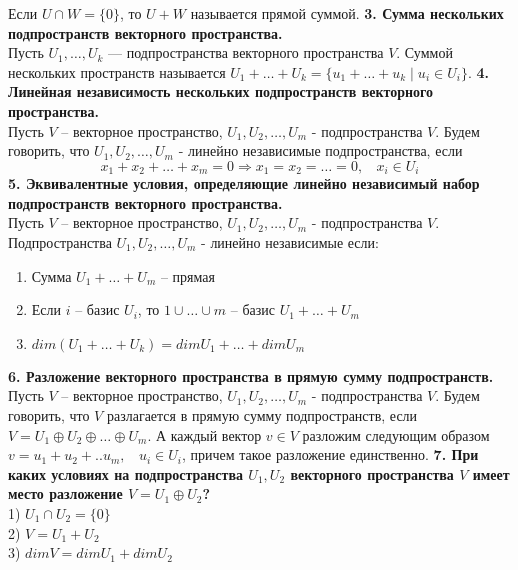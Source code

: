 \documentclass{article}
\begin{document}
Если $U \cap W = \{0\}$, то $U + W$ называется прямой суммой.
\newline
\newline
\textbf{3. Сумма нескольких подпространств векторного пространства.}\\
Пусть $U_1, \ldots, U_k$ --- подпространства векторного пространства $V$. Суммой нескольких пространств называется $U_1 + \ldots + U_k = \{u_1 + \ldots + u_k \; | \; u_i \in U_i \}$.
\newline
\newline
\textbf{4. Линейная независимость нескольких подпространств векторного пространства.}\\
   Пусть $V$ -- векторное пространство, $U_1, U_2, \dotso, U_m$ - подпространства $V$. Будем говорить, что $U_1, U_2, \dotso, U_m$ - линейно независимые подпространства, если
   $$
       x_1 + x_2 + \dotso + x_m = 0 \Rightarrow x_1 = x_2 = \dotso = 0, ~~~~ x_i \in U_i
   $$
\noindent
\textbf{5. Эквивалентные условия, определяющие линейно независимый набор подпространств векторного пространства.}\\
   Пусть $V$ -- векторное пространство, $U_1, U_2, \dotso, U_m$ - подпространства $V$. Подпространства $U_1, U_2, \dotso, U_m$ - линейно независимые если:
   \begin{enumerate}
       \item Сумма $U_1 + \dotso + U_m$ -- прямая
       \item Если $i$ -- базис $U_i$, то $1 \cup \dotso \cup m$ -- базис $U_1 + \dotso + U_m$
       \item $dim(U_1 + \dotso + U_k) = dim U_1 + \dotso + dim U_m$
   \end{enumerate}
\noindent
\textbf{6. Разложение векторного пространства в прямую сумму подпространств.}\\
   Пусть $V$ -- векторное пространство, $U_1, U_2, \dotso, U_m$ - подпространства $V$. Будем говорить, что $V$ разлагается в прямую сумму подпространств, если $V = U_1 \oplus U_2 \oplus \dotso \oplus U_m$. А каждый вектор $v\in V$ разложим следующим образом $v=u_1+u_2+..u_m,  ~~~~u_i\in U_i$, причем такое разложение единственно.
\newline
\newline
\textbf{7. При каких условиях на подпространства $U_1,U_2$ векторного пространства $V$ имеет место разложение $V = U_1 \oplus U_2$?}\\
1) $U_1 \cap U_2 = \{0\}$\\
2) $V = U_1+U_2$\\
3) $dimV= dimU_1+dimU_2$\\
\end{document}
